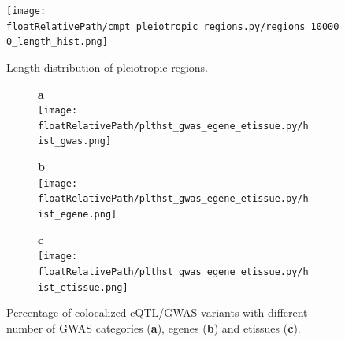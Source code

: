 %
%

\begin{figure}[]
\centering
%
\texttt{[image: \\floatRelativePath/cmpt\_pleiotropic\_regions.py/regions\_100000\_length\_hist.png]}
%
\caption{Length distribution of pleiotropic regions.} \label{fig:pleiotropy_region_distribution}
\end{figure}

%
%

\begin{figure}[]
\centering
%
\begin{subfigure}[]{.32\textwidth}
\textbf{a}
\\
\texttt{[image: \\floatRelativePath/plthst\_gwas\_egene\_etissue.py/hist\_gwas.png]}
\end{subfigure}
%
\begin{subfigure}[]{.32\textwidth}
\textbf{b}
\\
\texttt{[image: \\floatRelativePath/plthst\_gwas\_egene\_etissue.py/hist\_egene.png]}
\end{subfigure}
%
\begin{subfigure}[]{.32\textwidth}
\textbf{c}
\\
\texttt{[image: \\floatRelativePath/plthst\_gwas\_egene\_etissue.py/hist\_etissue.png]}
\end{subfigure}
%
\caption{Percentage of colocalized eQTL/GWAS variants with different number of GWAS categories (\textbf{a}), egenes (\textbf{b}) and etissues (\textbf{c}).} \label{fig:hist_gwas_egene_etissue}
\end{figure}

%
%


